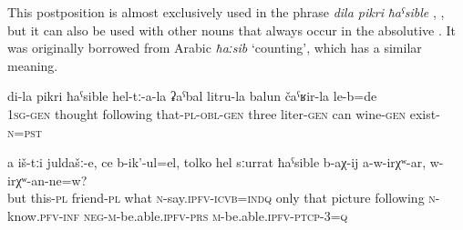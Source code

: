 This postposition is almost exclusively used in the phrase \textit{dila pikri} \textit{ħaˁsible}  , , but it can also be used with other nouns that always occur in the absolutive . It was originally borrowed from Arabic \textit{ħaːsib} `counting', which has a similar meaning.
%
\begin{exe}
	\ex
	\begin{xlist}
		\ex	\label{In my mind there was their 3-litre can with wine}
		\gll	di-la	pikri	ħaˁsible	hel-tː-a-la	ʡaˁbal	litru-la	balun	čaˁʁir-la le-b=de\\
			1\textsc{sg}-\textsc{gen}	thought	following	that-\textsc{pl}-\textsc{obl}-\textsc{gen}	three	liter-\textsc{gen} can	wine-\textsc{gen}	exist-\textsc{n}=\textsc{pst}\\
		\glt	{}

		\ex	\label{And these friends, what they are saying, only by means of the picture, (one) cannot know, can}
		\gll	a	iš-tːi	juldašː-e,	ce	b-ik'-ul=el,	tolko	hel	sːurrat	ħaˁsible	b-aχ-ij	a-w-irχʷ-ar,	w-irχʷ-an-ne=w?\\
			but	this-\textsc{pl}	friend-\textsc{pl}	what	\textsc{n}-say.\textsc{ipfv}-\textsc{icvb}=\textsc{indq}	only	that	picture	following	\textsc{n}-know.\textsc{pfv}-\textsc{inf}	\textsc{neg}-\textsc{m}-be.able.\textsc{ipfv}-\textsc{prs}	\textsc{m}-be.able.\textsc{ipfv}-\textsc{ptcp-3=q}\\
		\glt	{}
	\end{xlist}
\end{exe}


